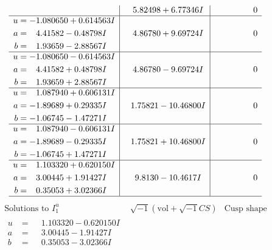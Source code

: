 \documentclass[1p]{elsarticle_modified}
\theoremstyle{definition}
\newcommand{\I}{\sqrt{-1}}
\begin{document}
$$\begin{array}{c|c|c}
 & \phantom{-}5.82498 + 6.77346 I & \phantom{-0.000000 } 0 \\ \hline\begin{aligned}
u &= -1.080650 + 0.614563 I \\
a &= \phantom{-}4.41582 - 0.48798 I \\
b &= \phantom{-}1.93659 - 2.88567 I\end{aligned}
 & \phantom{-}4.86780 + 9.69724 I & \phantom{-0.000000 } 0 \\ \hline\begin{aligned}
u &= -1.080650 - 0.614563 I \\
a &= \phantom{-}4.41582 + 0.48798 I \\
b &= \phantom{-}1.93659 + 2.88567 I\end{aligned}
 & \phantom{-}4.86780 - 9.69724 I & \phantom{-0.000000 } 0 \\ \hline\begin{aligned}
u &= \phantom{-}1.087940 + 0.606131 I \\
a &= -1.89689 + 0.29335 I \\
b &= -1.06745 - 1.47271 I\end{aligned}
 & \phantom{-}1.75821 - 10.46800 I & \phantom{-0.000000 } 0 \\ \hline\begin{aligned}
u &= \phantom{-}1.087940 - 0.606131 I \\
a &= -1.89689 - 0.29335 I \\
b &= -1.06745 + 1.47271 I\end{aligned}
 & \phantom{-}1.75821 + 10.46800 I & \phantom{-0.000000 } 0 \\ \hline\begin{aligned}
u &= \phantom{-}1.103320 + 0.620150 I \\
a &= \phantom{-}3.00445 + 1.91427 I \\
b &= \phantom{-}0.35053 + 3.02366 I\end{aligned}
 & \phantom{-}9.8130 - 10.4617 I & \phantom{-0.000000 } 0\\
 \hline 
 \end{array}$$\newpage$$\begin{array}{c|c|c}  
\text{Solutions to }I^u_{1}& \I (\text{vol} + \sqrt{-1}CS) & \text{Cusp shape}\\
 \hline 
\begin{aligned}
u &= \phantom{-}1.103320 - 0.620150 I \\
a &= \phantom{-}3.00445 - 1.91427 I \\
b &= \phantom{-}0.35053 - 3.02366 I\end{aligned}

\end{array}$$
\end{document}

